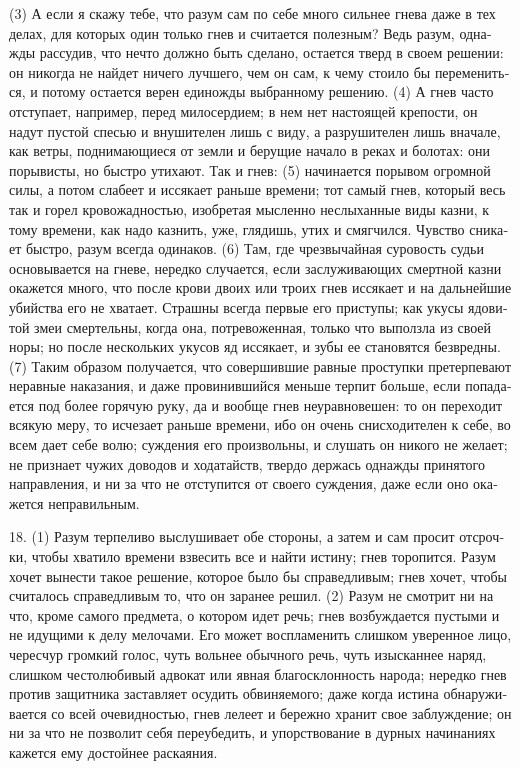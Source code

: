 (3) А если я ска­жу тебе, что разум сам по себе мно­го силь­нее гне­ва даже в тех делах, для кото­рых один толь­ко гнев и счи­та­ет­ся полез­ным? Ведь разум, одна­жды рас­судив, что нечто долж­но быть сде­ла­но, оста­ет­ся тверд в сво­ем реше­нии: он нико­гда не най­дет ниче­го луч­ше­го, чем он сам, к чему сто­и­ло бы пере­ме­нить­ся, и пото­му оста­ет­ся верен еди­но­жды выбран­но­му реше­нию. (4) А гнев часто отсту­па­ет, напри­мер, перед мило­сер­ди­ем; в нем нет насто­я­щей кре­по­сти, он надут пустой спе­сью и вну­ши­те­лен лишь с виду, а раз­ру­ши­те­лен лишь вна­ча­ле, как вет­ры, под­ни­маю­щи­е­ся от зем­ли и беру­щие нача­ло в реках и болотах: они поры­ви­сты, но быст­ро ути­ха­ют. Так и гнев: (5) начи­на­ет­ся поры­вом огром­ной силы, а потом сла­бе­ет и исся­ка­ет рань­ше вре­ме­ни; тот самый гнев, кото­рый весь так и горел кро­во­жад­но­стью, изо­бре­тая мыс­лен­но неслы­хан­ные виды каз­ни, к тому вре­ме­ни, как надо каз­нить, уже, глядишь, утих и смяг­чил­ся. Чув­ство сни­ка­ет быст­ро, разум все­гда оди­на­ков. (6) Там, где чрез­вы­чай­ная суро­вость судьи осно­вы­ва­ет­ся на гне­ве, неред­ко слу­ча­ет­ся, если заслу­жи­ваю­щих смерт­ной каз­ни ока­жет­ся мно­го, что после кро­ви дво­их или тро­их гнев исся­ка­ет и на даль­ней­шие убий­ства его не хва­та­ет. Страш­ны все­гда пер­вые его при­сту­пы; как уку­сы ядо­ви­той змеи смер­тель­ны, когда она, потре­во­жен­ная, толь­ко что выполз­ла из сво­ей норы; но после несколь­ких уку­сов яд исся­ка­ет, и зубы ее ста­но­вят­ся без­вред­ны. (7) Таким обра­зом полу­ча­ет­ся, что совер­шив­шие рав­ные про­ступ­ки пре­тер­пе­ва­ют нерав­ные нака­за­ния, и даже про­ви­нив­ший­ся мень­ше тер­пит боль­ше, если попа­да­ет­ся под более горя­чую руку, да и вооб­ще гнев неурав­но­ве­шен: то он пере­хо­дит вся­кую меру, то исче­за­ет рань­ше вре­ме­ни, ибо он очень снис­хо­ди­те­лен к себе, во всем дает себе волю; суж­де­ния его про­из­воль­ны, и слу­шать он нико­го не жела­ет; не при­зна­ет чужих дово­дов и хода­тайств, твер­до дер­жась одна­жды при­ня­то­го направ­ле­ния, и ни за что не отсту­пит­ся от сво­его суж­де­ния, даже если оно ока­жет­ся непра­виль­ным.

18. (1) Разум тер­пе­ли­во выслу­ши­ва­ет обе сто­ро­ны, а затем и сам про­сит отсроч­ки, чтобы хва­ти­ло вре­ме­ни взве­сить все и най­ти исти­ну; гнев торо­пит­ся. Разум хочет выне­сти такое реше­ние, кото­рое было бы спра­вед­ли­вым; гнев хочет, чтобы счи­та­лось спра­вед­ли­вым то, что он зара­нее решил. (2) Разум не смот­рит ни на что, кро­ме само­го пред­ме­та, о кото­ром идет речь; гнев воз­буж­да­ет­ся пусты­ми и не иду­щи­ми к делу мело­ча­ми. Его может вос­пла­ме­нить слиш­ком уве­рен­ное лицо, черес­чур гром­кий голос, чуть воль­нее обыч­но­го речь, чуть изыс­кан­нее наряд, слиш­ком често­лю­би­вый адво­кат или явная бла­го­склон­ность наро­да; неред­ко гнев про­тив защит­ни­ка застав­ля­ет осудить обви­ня­е­мо­го; даже когда исти­на обна­ру­жи­ва­ет­ся со всей оче­вид­но­стью, гнев леле­ет и береж­но хра­нит свое заблуж­де­ние; он ни за что не поз­во­лит себя пере­убедить, и упор­ст­во­ва­ние в дур­ных начи­на­ни­ях кажет­ся ему достой­нее рас­ка­я­ния.

